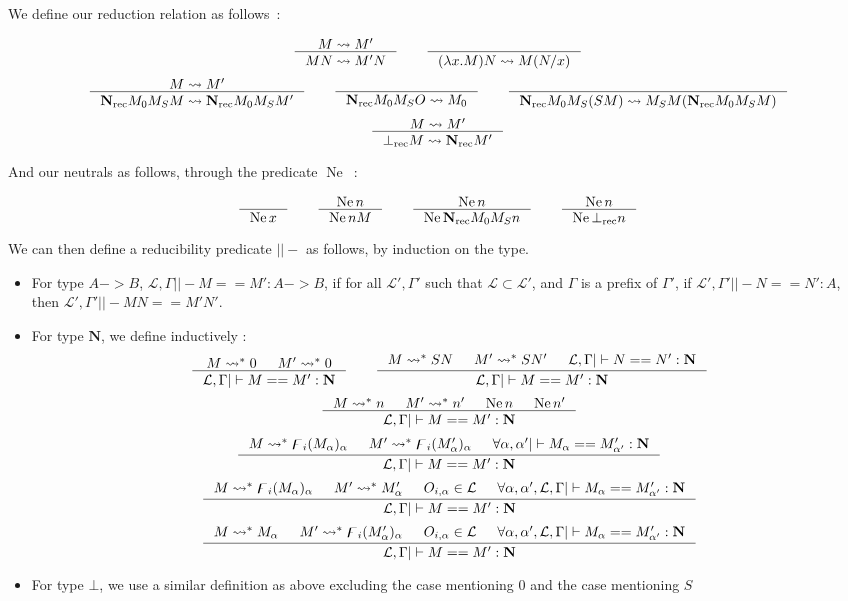 \documentclass[11pt]{article}
\DeclareMathOperator{\rec}{rec}
\DeclareMathOperator{\neu}{Ne}
\newcommand{\0}{\mathbf{0}}
\newcommand{\1}{\mathbf{1}}
\newcommand{\nat}{\mathbf{N}}
\newcommand{\tctx}{\Gamma}
\newcommand{\fctx}{\mathcal{L}}
\begin{document}
We define our reduction relation as follows~:

$$
    \inference{M\leadsto M'}{MN \leadsto M'N} \qquad
    \inference{}{(\lambda x. M)N \leadsto M(N/x)}
$$
$$
    \inference{M \leadsto M'}{\nat_{\rec}M_0M_S M\leadsto\nat_{\rec}M_0M_SM'}\qquad
    \inference{}{\nat_{\rec}M_0M_SO \leadsto M_0}\qquad
    \inference{}{\nat_{\rec} M_0M_S (S M) \leadsto M_SM(\nat_{\rec}M_0M_SM )}
$$
$$
    \inference{M \leadsto M'}{\bot_{\rec}M\leadsto\nat_{\rec}M'}
$$

And our neutrals as follows, through the predicate $\neu$~:

$$
    \inference{}{\neu x} \qquad
    \inference{\neu n}{\neu n M} \qquad
    \inference{\neu n}{\neu \nat_{\rec}M_0M_S n} \qquad
    \inference{\neu n}{\neu \bot_{\rec}n}
$$

We can then define a reducibility predicate $||-$ as follows, by induction on the type.
\begin{itemize}
    \item For type $A -> B$, $\fctx,\tctx ||- M == M' : A -> B$, if for all $\fctx',\tctx'$ such that $\fctx\subset\fctx'$, and $\tctx$ is a prefix of $\tctx'$, if $\fctx',\tctx' ||- N == N' : A$, then $\fctx', \tctx' ||- MN == M'N'$.
    \item For type $\nat$, we define inductively :
$$
    \inference{M \leadsto^\ast 0&M' \leadsto^\ast 0}{\fctx,\tctx ||- M == M' : \nat}\qquad
    \inference{M \leadsto^\ast SN&M' \leadsto^\ast SN' &\fctx,\tctx ||- N == N' : \nat}{\fctx,\tctx ||- M == M' : \nat}
$$
$$
    \inference{M \leadsto^\ast n&M' \leadsto^\ast n' &\neu n & \neu n'}{\fctx,\tctx ||- M == M' : \nat}
$$
$$
    \inference{M \leadsto^\ast \digamma_i (M_\alpha)_\alpha&M' \leadsto^\ast \digamma_i({M'_\alpha})_\alpha & \forall \alpha,\alpha' ||- M_\alpha == M'_{\alpha'} : \nat}{\fctx,\tctx ||- M == M' : \nat}
$$
$$
    \inference{M \leadsto^\ast \digamma_i(M_\alpha)_\alpha&M' \leadsto^\ast M'_\alpha & O_{i,\alpha}\in \fctx & \forall \alpha,\alpha', \fctx,\tctx ||- M_\alpha == M'_{\alpha'} : \nat}{\fctx,\tctx ||- M == M' : \nat}
$$
$$
    \inference{M \leadsto^\ast M_\alpha&M' \leadsto^\ast \digamma_i (M'_\alpha)_\alpha & O_{i,\alpha}\in \fctx & \forall \alpha,\alpha', \fctx,\tctx ||- M_\alpha == M'_{\alpha'} : \nat}{\fctx,\tctx ||- M == M' : \nat}
$$
    \item For type $\bot$, we use a similar definition as above excluding the case mentioning $0$ and the case mentioning $S$ 
\end{itemize}
\end{document}
